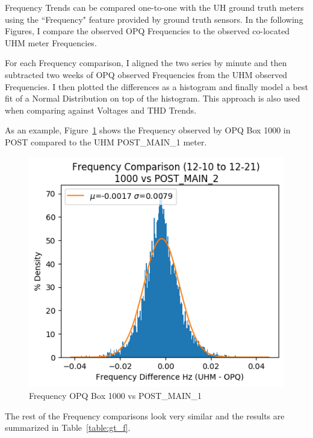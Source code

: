Frequency Trends can be compared one-to-one with the UH ground truth meters using the ``Frequency" feature provided by ground truth sensors. In the following Figures, I compare the observed OPQ Frequencies to the observed co-located UHM meter Frequencies.

For each Frequency comparison, I aligned the two series by minute and then subtracted two weeks of OPQ observed Frequencies from the UHM observed Frequencies. I then plotted the differences as a histogram and finally model a best fit of a Normal Distribution on top of the histogram. This approach is also used when comparing against Voltages and THD Trends.

As an example, Figure~\ref{fig:f_hist} shows the Frequency observed by OPQ Box 1000 in POST compared to the UHM POST\_MAIN\_1 meter.

\begin{figure}[H]
    \centering
    \includegraphics[width=0.75\linewidth]{figures/f_hist_1000_POST_MAIN_2.png}
    \caption{Frequency OPQ Box 1000 vs POST\_MAIN\_1}
    \label{fig:f_hist}
\end{figure}

The rest of the Frequency comparisons look very similar and the results are summarized in Table~\ref{table:gt_f}.

